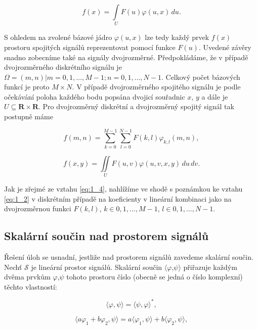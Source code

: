 \begin{equation} \label{eq:1_3}
    f(x) = \int\limits_{U} F(u) \varphi (u, x)\, du.
\end{equation}

S ohledem na zvolené bázové jádro $\varphi(u,x)$ lze tedy každý prvek $f(x)$ prostoru spojitých signálů reprezentovat pomocí funkce $F(u)$.
Uvedené závěry snadno zobecníme také na signály dvojrozměrné.
Předpokládáme, že v případě dvojrozměrného diskrétního signálu je $\Omega = {(m,n) | m = 0, 1, \dots, M-1; n = 0, 1, \dots, N-1}$. Celkový počet bázových funkcí je proto $M \times N$.
V případě dvojrozměrného spojitého signálu je podle očekávání poloha každého bodu popsána dvojicí souřadnic $x$, $y$ a dále je $U\subseteq \mathbf{R} \times \mathbf{R}$.
Pro dvojrozměrný diskrétní a dvojrozměrný spojitý signál tak postupně máme

\begin{equation} \label{eq:1_4}
    f(m, n) = \sum\limits_{k=0}^{M-1} \sum\limits_{l=0}^{N-1} F(k, l) \varphi_{k,l} (m, n),
\end{equation}

\begin{equation} \label{eq:1_5}
    f(x, y) = \iint\limits_{U} F(u, v) \varphi (u, v, x, y)\, du\, dv.
\end{equation}

Jak je zřejmé ze vztahu \eqref{eq:1_4}, nahlížíme ve shodě s poznámkou ke vztahu \eqref{eq:1_2} v diskrétním případě na koeficienty v lineární kombinaci jako na dvojrozměrnou funkci $F(k,l)$, $k \in {0, 1, \dots, M-1}$, $l \in {0, 1, \dots, N-1}$.

\subsection*{Skalární součin nad prostorem signálů}
%
Řešení úloh se usnadní, jestliže nad prostorem signálů zavedeme skalární součin. Nechť $\mathscr{S}$ je lineární prostor signálů. Skalární součin $\langle$$\varphi$,$\psi$$\rangle$ přiřazuje každým dvěma prvkům $\varphi$,$\psi$ tohoto prostoru číslo (obecně se jedná o číslo komplexní) těchto vlastností:

\begin{equation} \label{eq:1_6}
    \langle \varphi, \psi \rangle = \langle \psi, \varphi \rangle^*,
\end{equation}

\begin{equation} \label{eq:1_7}
    \langle a \varphi_1 + b \varphi_2, \psi \rangle = a \langle \varphi_1, \psi \rangle + b \langle \varphi_2, \psi \rangle,
\end{equation}

